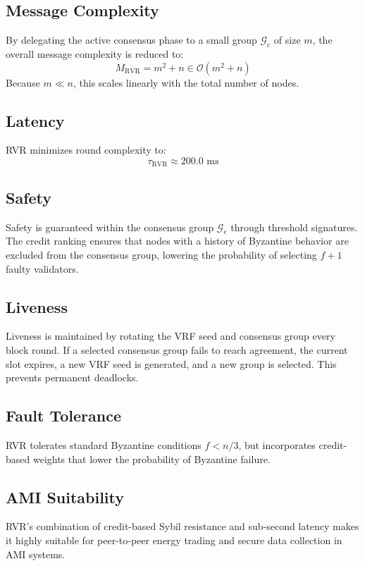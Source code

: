 \documentclass[12pt, oneside, a4paper]{report}
\theoremstyle{definition}
\theoremstyle{remark}
\begin{document}
\subsection{Message Complexity}
By delegating the active consensus phase to a small group $\mathcal{G}_{\mathrm{c}}$ of size $m$, the overall message complexity is reduced to:
\begin{equation}
M_{\mathrm{RVR}} = m^2 + n \in \mathcal{O}(m^2 + n)
\end{equation}
Because $m \ll n$, this scales linearly with the total number of nodes.

\subsection{Latency}
RVR minimizes round complexity to:
\begin{equation}
\tau_{\mathrm{RVR}} \approx 200.0 \text{ ms}
\end{equation}

\subsection{Safety}
Safety is guaranteed within the consensus group $\mathcal{G}_{\mathrm{c}}$ through threshold signatures. The credit ranking ensures that nodes with a history of Byzantine behavior are excluded from the consensus group, lowering the probability of selecting $f+1$ faulty validators.

\subsection{Liveness}
Liveness is maintained by rotating the VRF seed and consensus group every block round. If a selected consensus group fails to reach agreement, the current slot expires, a new VRF seed is generated, and a new group is selected. This prevents permanent deadlocks.

\subsection{Fault Tolerance}
RVR tolerates standard Byzantine conditions $f < n/3$, but incorporates credit-based weights that lower the probability of Byzantine failure.

\subsection{AMI Suitability}
RVR's combination of credit-based Sybil resistance and sub-second latency makes it highly suitable for peer-to-peer energy trading and secure data collection in AMI systems.
\end{document}
